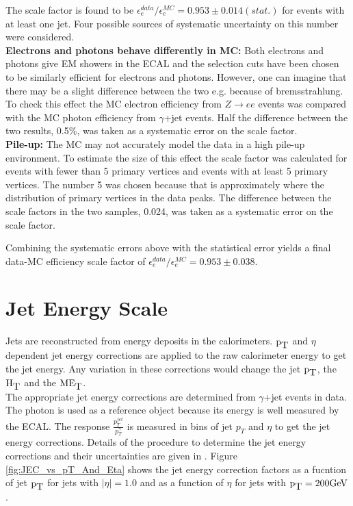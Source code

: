 
The scale factor is found to be $\epsilon_{e}^{data}/\epsilon_{e}^{MC} =
0.953\pm 0.014(stat.)$ for events with at least one jet. Four possible sources
of systematic uncertainty on this number were considered. \\

{\bf Electrons and photons behave differently in MC:} Both electrons and photons
give EM showers in the ECAL and the selection cuts have been chosen to be
similarly efficient for electrons and photons. However, one can imagine that
there may be a slight difference between the two e.g. because of bremsstrahlung.
To check this effect the MC electron efficiency from $Z\rightarrow ee$ events
was compared with the MC photon efficiency from $\gamma$+jet events. Half the
difference between the two results, 0.5\%, was taken as a systematic error on
the scale factor. \\

{\bf Pile-up:} The MC may not accurately model the data in a high pile-up
environment. To estimate the size of this effect the scale factor was calculated
for events with fewer than 5 primary vertices and events with at least 5 primary
vertices. The number 5 was chosen because that is approximately where the 
distribution of primary vertices in the data peaks. The difference between the
scale factors in the two samples, 0.024, was taken as a systematic error on the 
scale factor. \\

{\bf }

Combining the systematic errors above with the statistical error yields a final
data-MC efficiency scale factor of $\epsilon_{e}^{data}/\epsilon_{e}^{MC} =
0.953\pm0.038$.

\section{Jet Energy Scale}

Jets are reconstructed from energy deposits in the calorimeters. $\mbox{p}_{\mbox{T}}$ and
$\eta$ dependent jet energy corrections are applied to the raw calorimeter 
energy to get the jet energy. Any variation in these corrections would change 
the jet $\mbox{p}_{\mbox{T}}$, the $\mbox{H}_{\mbox{T}}$ and the $\mbox{ME}_{\mbox{T}}$. \\

The appropriate jet energy corrections are determined from $\gamma$+jet events
in data. The photon is used as a reference object because its energy is well 
measured by the ECAL. The response $\frac{p_{T}^{jet}}{p_{T}^{\gamma}}$
is measured in bins of jet $p_{T}$ and $\eta$ to get the jet energy corrections. 
Details of the procedure to determine the jet energy corrections and their 
uncertainties are given in \cite{jec}. Figure \ref{fig:JEC_vs_pT_And_Eta} shows 
the jet energy correction factors as a fucntion of jet $\mbox{p}_{\mbox{T}}$ for jets with 
$|\eta| = 1.0$ and as a function of $\eta$ for jets with $\mbox{p}_{\mbox{T}} = 200 \mbox{GeV}$. \\

